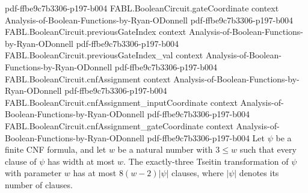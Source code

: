 \begin{theorem}
  {pdf-ffbe9c7b3306-p197-b004}
\proofstep
  {FABL.BooleanCircuit.gateCoordinate}
  {context}
  {Analysis-of-Boolean-Functions-by-Ryan-ODonnell}
  {pdf-ffbe9c7b3306-p197-b004}
\proofstep
  {FABL.BooleanCircuit.previousGateIndex}
  {context}
  {Analysis-of-Boolean-Functions-by-Ryan-ODonnell}
  {pdf-ffbe9c7b3306-p197-b004}
\proofstep
  {FABL.BooleanCircuit.previousGateIndex_val}
  {context}
  {Analysis-of-Boolean-Functions-by-Ryan-ODonnell}
  {pdf-ffbe9c7b3306-p197-b004}
\proofstep
  {FABL.BooleanCircuit.cnfAssignment}
  {context}
  {Analysis-of-Boolean-Functions-by-Ryan-ODonnell}
  {pdf-ffbe9c7b3306-p197-b004}
\proofstep
  {FABL.BooleanCircuit.cnfAssignment_inputCoordinate}
  {context}
  {Analysis-of-Boolean-Functions-by-Ryan-ODonnell}
  {pdf-ffbe9c7b3306-p197-b004}
\proofstep
  {FABL.BooleanCircuit.cnfAssignment_gateCoordinate}
  {context}
  {Analysis-of-Boolean-Functions-by-Ryan-ODonnell}
  {pdf-ffbe9c7b3306-p197-b004}
Let $\psi$ be a finite CNF formula, and let $w$ be a natural number with $3\le w$ such
that every clause of $\psi$ has width at most $w$. The exactly-three Tseitin
transformation of $\psi$ with parameter $w$ has at most $8(w-2)|\psi|$ clauses, where
$|\psi|$ denotes its number of clauses.
\end{theorem}

